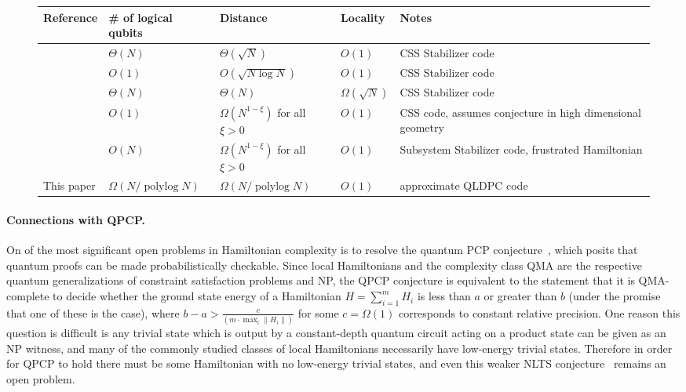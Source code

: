 \documentclass[11pt,letterpaper]{article}
\theoremstyle{definition}
\theoremstyle{remark}
\DeclareMathOperator{\polylog}{polylog}
\numberwithin{equation}{section}
\let\origparagraph\paragraph
\renewcommand{\paragraph}[1]{\origparagraph{#1.}}
\theoremstyle{definition}
\begin{document}
%


\begin{figure}[H]
\begin{center}
    \begin{tabular}{ | l | l | l | l | p{5cm} | }
    \hline
    \textbf{Reference} & \textbf{\# of logical qubits} & \textbf{Distance} & \textbf{Locality} & \textbf{Notes} \\ \hline
    \cite{tillich2014quantum} & $\Theta(N)$ & $\Theta(\sqrt{N})$ & $O(1)$ & CSS Stabilizer code \\ \hline
    \cite{freedman2002z2} & $O(1)$ & $O(\sqrt{N \log N})$ & $O(1)$ & CSS Stabilizer code \\ \hline
    \cite{bravyi2014homological} & $\Theta(N)$ & $\Theta(N)$ & $\Omega(\sqrt{N})$ & CSS Stabilizer code \\ \hline
  \cite{hastings2017quantum,hastings2017weight} & $O(1)$ & $\Omega(N^{1 - \xi})$ for all $\xi > 0$ & $O(1)$ & CSS code, assumes conjecture in high dimensional geometry \\ \hline
  \cite{bacon2017sparse} & $O(N)$ & $\Omega(N^{1 - \xi})$ for all $\xi > 0$ & $O(1)$ & Subsystem Stabilizer code, frustrated Hamiltonian \\ \hline
  This paper & $\Omega(N/\polylog N)$ & $\Omega(N/\polylog N)$ & $O(1)$ & approximate QLDPC code \\ \hline
    \end{tabular}
\end{center}
\end{figure}

\paragraph{Connections with QPCP} 

On of the most significant open problems in Hamiltonian complexity is to resolve the quantum PCP conjecture~\cite{aharonov2013guest}, which posits that quantum proofs can be made probabilistically checkable.  Since local Hamiltonians and the complexity class QMA are the respective quantum generalizations of constraint satisfaction problems and NP, the QPCP conjecture is equivalent to the statement that it is QMA-complete to decide whether the ground state energy of a Hamiltonian $H = \sum_{i =1}^m H_i$ is less than $a$ or greater than $b$ (under the promise that one of these is the case), where $b - a > \frac{c}{(m\cdot \max_i \|H_i\|)}$ for some $c = \Omega(1)$ corresponds to constant relative precision.  One reason this question is difficult is any trivial state which is output by a constant-depth quantum circuit acting on a product state can be given as an NP witness, and many of the commonly studied classes of local Hamiltonians necessarily have low-energy trivial states.  Therefore in order for QPCP to hold there must be some Hamiltonian with no low-energy trivial states, and even this weaker NLTS conjecture~\cite{hastings2013trivial} remains an open problem.   
\end{document}
